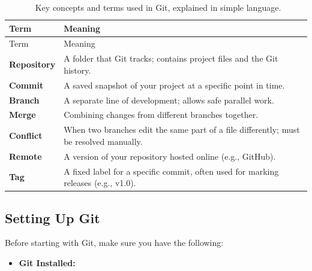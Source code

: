 \documentclass[
  11pt,
  a4paper,
]{article}
\providecommand{\tightlist}{%
  \setlength{\itemsep}{0pt}\setlength{\parskip}{0pt}}\usepackage{longtable,booktabs,array}
\begin{document}
\begin{longtable}[]{@{}
  >{\raggedright\arraybackslash}p{}
  >{\raggedright\arraybackslash}p{}@{}}
\caption{~Key concepts and terms used in Git, explained in simple
language.}\tabularnewline
\toprule\noalign{}
\begin{minipage}[b]{\linewidth}\raggedright
Term
\end{minipage} & \begin{minipage}[b]{\linewidth}\raggedright
Meaning
\end{minipage} \\
\midrule\noalign{}
\endfirsthead
\toprule\noalign{}
\begin{minipage}[b]{\linewidth}\raggedright
Term
\end{minipage} & \begin{minipage}[b]{\linewidth}\raggedright
Meaning
\end{minipage} \\
\midrule\noalign{}
\endhead
\bottomrule\noalign{}
\endlastfoot
\textbf{Repository} & A folder that Git tracks; contains project files
and the Git history. \\
\textbf{Commit} & A saved snapshot of your project at a specific point
in time. \\
\textbf{Branch} & A separate line of development; allows safe parallel
work. \\
\textbf{Merge} & Combining changes from different branches together. \\
\textbf{Conflict} & When two branches edit the same part of a file
differently; must be resolved manually. \\
\textbf{Remote} & A version of your repository hosted online (e.g.,
GitHub). \\
\textbf{Tag} & A fixed label for a specific commit, often used for
marking releases (e.g., v1.0). \\
\end{longtable}

\newpage

\subsection{Setting Up Git}\label{setting-up-git}

Before starting with Git, make sure you have the following:

\begin{itemize}
\tightlist
\item
  \textbf{Git Installed:}
\end{itemize}
\end{document}
